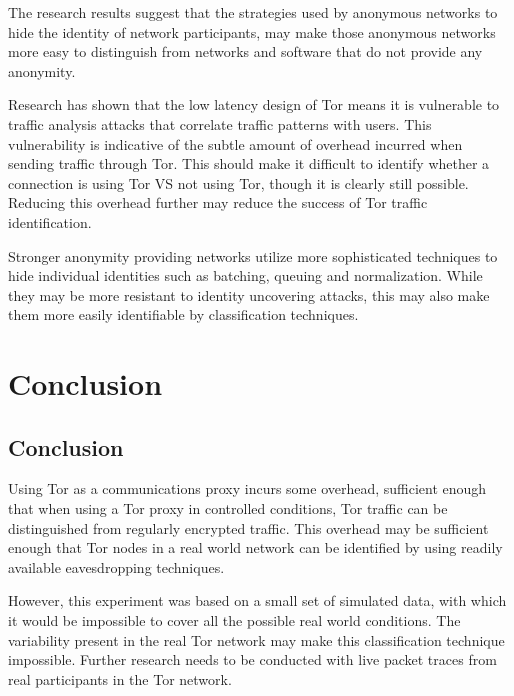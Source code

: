 The research results suggest that the strategies used by anonymous networks to
hide the identity of network participants, may make those anonymous networks
more easy to distinguish from networks and software that do not provide any
anonymity.

Research has shown that the low latency design of Tor means it is vulnerable to
traffic analysis attacks that correlate traffic patterns with users. This
vulnerability is indicative of the subtle amount of overhead incurred when
sending traffic through Tor. This should make it difficult to identify whether a
connection is using Tor VS not using Tor, though it is clearly still possible.
Reducing this overhead further may reduce the success of Tor traffic
identification.

Stronger anonymity providing networks utilize more sophisticated techniques to
hide individual identities such as batching, queuing and normalization. While
they may be more resistant to identity uncovering attacks, this may also make
them more easily identifiable by classification techniques.


\chapter{Conclusion}

\section{Conclusion}

Using Tor as a communications proxy incurs some overhead, sufficient enough that
when using a Tor proxy in controlled conditions, Tor traffic can be
distinguished from regularly encrypted traffic. This overhead may be sufficient
enough that Tor nodes in a real world network can be identified by using readily
available eavesdropping techniques.

However, this experiment was based on a small set of simulated data, with which
it would be impossible to cover all the possible real world conditions. The
variability present in the real Tor network may make this classification
technique impossible. Further research needs to be conducted with live packet
traces from real participants in the Tor network.
